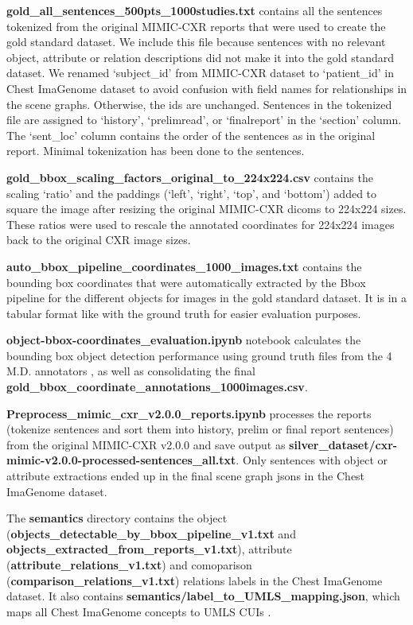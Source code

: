 \noindent \textbf{gold\_all\_sentences\_500pts\_1000studies.txt} contains all the sentences tokenized from the original MIMIC-CXR reports that were used to create the gold standard dataset. We include this file because sentences with no relevant object, attribute or relation descriptions did not make it into the gold standard dataset. We renamed `subject\_id' from MIMIC-CXR dataset to `patient\_id' in Chest ImaGenome dataset to avoid confusion with field names for relationships in the scene graphs. Otherwise, the ids are unchanged. Sentences in the tokenized file are assigned to `history', `prelimread', or `finalreport' in the `section' column. The `sent\_loc' column contains the order of the sentences as in the original report. Minimal tokenization has been done to the sentences.

\noindent \textbf{gold\_bbox\_scaling\_factors\_original\_to\_224x224.csv} contains the scaling `ratio' and the paddings (`left', `right', `top', and `bottom') added to square the image after resizing the original MIMIC-CXR dicoms to 224x224 sizes. These ratios were used to rescale the annotated coordinates for 224x224 images back to the original CXR image sizes.

\noindent \textbf{auto\_bbox\_pipeline\_coordinates\_1000\_images.txt} contains the bounding box coordinates that were automatically extracted by the Bbox pipeline for the different objects for images in the gold standard dataset. It is in a tabular format like with the ground truth for easier evaluation purposes.

\noindent \textbf{object-bbox-coordinates\_evaluation.ipynb} notebook calculates the bounding box object detection performance using ground truth files from the 4 M.D. annotators , as well as consolidating the final \textbf{gold\_bbox\_coordinate\_annotations\_1000images.csv}.

\noindent \textbf{Preprocess\_mimic\_cxr\_v2.0.0\_reports.ipynb} processes the reports (tokenize sentences and sort them into history, prelim or final report sentences) from the original MIMIC-CXR v2.0.0 and save output as \textbf{silver\_dataset/cxr-mimic-v2.0.0-processed-sentences\_all.txt}. Only sentences with object or attribute extractions ended up in the final scene graph jsons in the Chest ImaGenome dataset.

\noindent The \textbf{semantics} directory contains the object (\textbf{objects\_detectable\_by\_bbox\_pipeline\_v1.txt} and \textbf{objects\_extracted\_from\_reports\_v1.txt}), attribute (\textbf{attribute\_relations\_v1.txt}) and comoparison (\textbf{comparison\_relations\_v1.txt}) relations labels in the Chest ImaGenome dataset. It also contains \textbf{semantics/label\_to\_UMLS\_mapping.json}, which maps all Chest ImaGenome concepts to UMLS CUIs \cite{bodenreider2004unified}.



